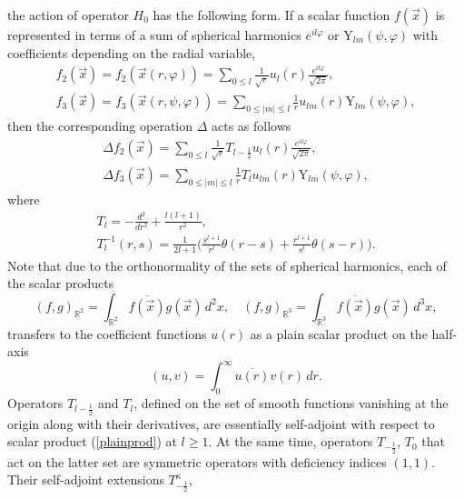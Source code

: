 \documentclass[12pt]{article}
\newcommand{\ol}{\overline}
\newcommand{\Hh}{H}
\newcommand{\RR}{\mathbb{R}}
\newcommand{\YY}{\mathrm{Y}}
\begin{document}
	the action of operator
$ \Hh_{0} $
	has the following form.
	If a scalar function
$ f(\vec{x}) $
	is represented in terms of a sum of spherical harmonics
$ e^{il\varphi} $ or
$ \YY_{lm}(\psi,\varphi) $
	with coefficients depending on the radial variable,
\begin{gather*}
    f_{2}(\vec{x}) = f_{2}(\vec{x}(r,\varphi)) = \sum_{0\leq l}
    \frac{1}{\sqrt{r}} u_{l}(r)
        \frac{e^{il\varphi}}{\sqrt{2\pi}} , \\
    f_{3}(\vec{x}) = f_{3}(\vec{x}(r,\psi,\varphi)) = \sum_{0\leq |m| \leq l}
    \frac{1}{r} u_{lm}(r)
        \YY_{lm}(\psi,\varphi) , 
\end{gather*}
	then the corresponding operation
$ \Delta $
	acts as follows
\begin{gather*}
    \Delta f_{2}(\vec{x})
        = \sum_{0\leq l} \frac{1}{\sqrt{r}}T_{l-\frac{1}{2}} u_{l}(r)
	    \frac{e^{il\varphi}}{\sqrt{2\pi}} , \\
    \Delta f_{3}(\vec{x})
        = \sum_{0\leq |m| \leq l} \frac{1}{r}T_{l} u_{lm}(r)
	\YY_{lm}(\psi,\varphi) ,
\end{gather*}
	where
\begin{gather}
\label{Tl}
    T_{l} = -\frac{d^{2}}{dr^{2}} + \frac{l(l+1)}{r^{2}} ,\\
\label{Tl1}
    T_{l}^{-1}(r,s) = \frac{1}{2l+1}\bigl(\frac{s^{l+1}}{r^{l}} \theta(r-s)
	+ \frac{r^{l+1}}{s^{l}}\theta(s-r)\bigr).
\end{gather}
	Note that due to the orthonormality of the sets of spherical
	harmonics, each of the scalar products
\begin{equation*}
    (f,g)_{\RR^{2}} = \int_{\RR^{2}} \ol{f(\vec{x})} g(\vec{x}) \,d^{2}x ,
\quad
    (f,g)_{\RR^{3}} = \int_{\RR^{3}} \ol{f(\vec{x})} g(\vec{x}) \,d^{3}x ,
\end{equation*}
	transfers to the coefficient functions
$ u(r) $
	as a plain scalar product on the half-axis
\begin{equation}
\label{plainprod}
    (u,v) = \int_{0}^{\infty} \ol{u(r)} v(r) \, dr .
\end{equation}
	Operators
$ T_{l-\frac{1}{2}} $ and
$ T_{l} $,
	defined on the set of smooth functions vanishing at the origin
	along with their derivatives,
	are essentially self-adjoint with respect to scalar product
(\ref{plainprod})
	at
$ l \geq 1 $.
	At the same time, operators
$ T_{-\frac{1}{2}} $,
$ T_{0} $
    that act on the latter set are symmetric operators with deficiency indices
$ (1,1) $.
	Their self-adjoint extensions
$ T_{-\frac{1}{2}}^{\kappa} $,
\end{document}
